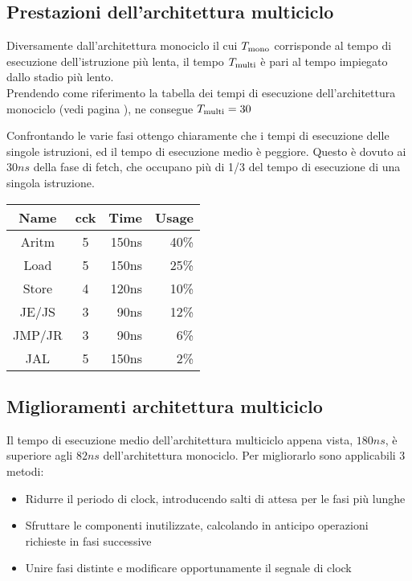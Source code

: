 \documentclass[../ace.tex]{subfiles}
\begin{document}
\subsection{Prestazioni dell'architettura multiciclo}
\begin{minipage}[t]{.66\textwidth}
    \vspace{0pt}
    Diversamente dall'architettura monociclo il cui $T_\text{mono}$ corrisponde al tempo di esecuzione dell'istruzione più lenta,
    il tempo $T_\text{multi}$ è pari al tempo impiegato dallo stadio più lento.
    \\
    Prendendo come riferimento la tabella dei tempi di esecuzione dell'architettura monociclo (vedi pagina
    \pageref{tab:tempi_esecuzione_monociclo}), ne consegue $T_\text{multi} =30$

    Confrontando le varie fasi ottengo chiaramente che i tempi di esecuzione delle singole istruzioni, ed il tempo di
    esecuzione medio è peggiore. Questo è dovuto ai $30ns$ della fase di fetch, che occupano più di 1/3 del tempo di
    esecuzione di una singola istruzione.
\end{minipage}
\begin{minipage}[t]{.33\textwidth}
    \footnotesize
    \let\fs\tiny
    \vspace{-2em}
    \begin{center}
        \begin{tabu}{|c|c|r|r|}
            \hline
            \rowfont{\bfseries\centering}
            Name & cck & Time & Usage \\
            \hline
            \hline
            Aritm  & 5& 150ns &40\fs\%\\
            \hline
            Load & 5& 150ns   &25\fs\%\\
            \hline
            Store & 4& 120ns  &10\fs\%\\
            \hline
            JE/JS& 3& 90ns    &12\fs\%\\
            \hline
            JMP/JR& 3& 90ns   &6\fs\%\\
            \hline
            JAL& 5& 150ns     &2\fs\%\\
            \hline
        \end{tabu}
    \end{center}
\end{minipage}

\subsection{Miglioramenti architettura multiciclo}
Il tempo di esecuzione medio dell'architettura multiciclo appena vista, $180ns$, è superiore agli $82ns$ dell'architettura monociclo.
Per migliorarlo sono applicabili 3 metodi:
\begin{itemize}
    \item Ridurre il periodo di clock, introducendo salti di attesa per le fasi più lunghe
    \item Sfruttare le componenti inutilizzate, calcolando in anticipo operazioni richieste in fasi successive
    \item Unire fasi distinte e modificare opportunamente il segnale di clock
\end{itemize}
\end{document}
